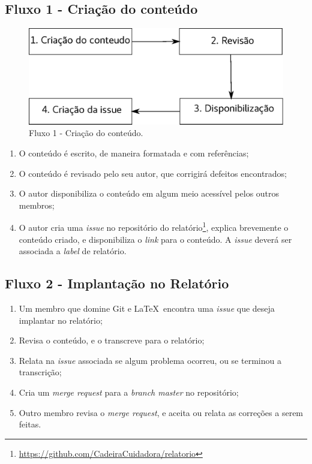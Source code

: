 \subsection{Fluxo 1 - Criação do conteúdo}

\begin{figure}[H]
  \centering
    \includegraphics[width=\textwidth]{figuras/fluxo1.eps}
  \caption{Fluxo 1 - Criação do conteúdo.}
  \label{fig:fluxo1}
\end{figure}

\begin{enumerate}
  \item O conteúdo é escrito, de maneira formatada e com referências;
  \item O conteúdo é revisado pelo seu autor, que corrigirá defeitos encontrados;
  \item O autor disponibiliza o conteúdo em algum meio acessível pelos outros membros;
  \item O autor cria uma \textit{issue} no repositório do
    relatório\footnote{\url{https://github.com/CadeiraCuidadora/relatorio}}, explica brevemente
    o conteúdo criado, e disponibiliza o \textit{link} para o conteúdo. A \textit{issue} deverá ser associada a \textit{label} de relatório.
\end{enumerate}

\subsection{Fluxo 2 - Implantação no Relatório}

\begin{enumerate}
  \item Um membro que domine Git e \LaTeX\ encontra uma \textit{issue} que deseja
  implantar no relatório;
  \item Revisa o conteúdo, e o transcreve para o relatório;
  \item Relata na \textit{issue} associada se algum problema ocorreu, ou se terminou a transcrição;
  \item Cria um \textit{merge request} para a \textit{branch master} no repositório;
  \item Outro membro revisa o \textit{merge request}, e aceita ou relata as correções a serem feitas.
\end{enumerate}

